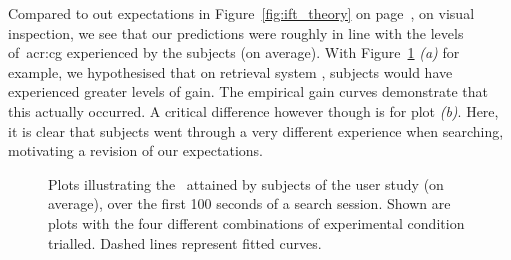 Compared to out expectations in Figure~\ref{fig:ift_theory} on page~\pageref{fig:ift_theory}, on visual inspection, we see that our predictions were roughly in line with the levels of~\gls{acr:cg} experienced by the subjects (on average). With Figure~\ref{fig:ift_empirical} \emph{(a)} for example, we hypothesised that on retrieval system , subjects would have experienced greater levels of gain. The empirical gain curves demonstrate that this actually occurred. A critical difference however though is for plot \emph{(b)}. Here, it is clear that subjects went through a very different experience when searching, motivating a revision of our expectations.

\begin{figure}[t!]
    \centering
    \caption[\gls{acr:ift} and diversification: empirical results]{Plots illustrating the~ attained by subjects of the user study (on average), over the first 100 seconds of a search session. Shown are plots with the four different combinations of experimental condition trialled. Dashed lines represent fitted curves.}
    \label{fig:ift_empirical}
\end{figure}

